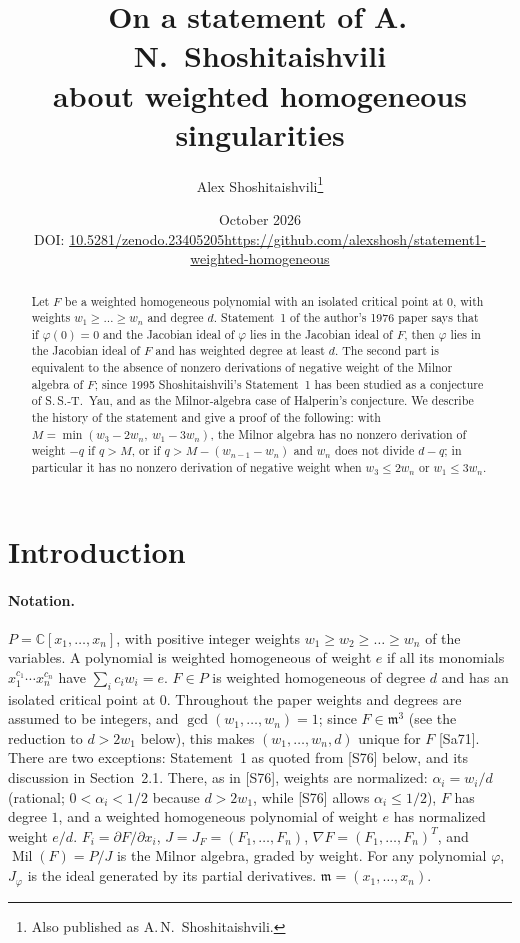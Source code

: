 \documentclass[11pt]{article}
\title{On a statement of A.\,N.~Shoshitaishvili\\ about weighted homogeneous singularities}
\author{Alex Shoshitaishvili\thanks{Also published as A.\,N.~Shoshitaishvili.}}
\date{October 2026\\[4pt]{\small DOI: \href{https://doi.org/10.5281/zenodo.23405205}{10.5281/zenodo.23405205}\quad \url{https://github.com/alexshosh/statement1-weighted-homogeneous}}}
\newcommand{\C}{\mathbb{C}}
\newcommand{\Mil}{\operatorname{Mil}(F)}
\theoremstyle{remark}
\begin{document}
\maketitle

\begin{abstract}
Let $F$ be a weighted homogeneous polynomial with an isolated critical point at $0$, with weights $w_1\ge\dots\ge w_n$ and degree $d$. Statement~1 of the author's 1976 paper says that if $\varphi(0)=0$ and the Jacobian ideal of $\varphi$ lies in the Jacobian ideal of $F$, then $\varphi$ lies in the Jacobian ideal of $F$ and has weighted degree at least $d$. The second part is equivalent to the absence of nonzero derivations of negative weight of the Milnor algebra of $F$; since 1995 Shoshitaishvili's Statement~1 has been studied as a conjecture of S.\,S.-T.~Yau, and as the Milnor-algebra case of Halperin's conjecture. We describe the history of the statement and give a proof of the following: with $M=\min(w_3-2w_n,\ w_1-3w_n)$, the Milnor algebra has no nonzero derivation of weight $-q$ if $q>M$, or if $q>M-(w_{n-1}-w_n)$ and $w_n$ does not divide $d-q$; in particular it has no nonzero derivation of negative weight when $w_3\le2w_n$ or $w_1\le3w_n$.
\end{abstract}

\section{Introduction}

\paragraph{Notation.} $P=\C[x_1,\dots,x_n]$, with positive integer weights $w_1\ge w_2\ge\dots\ge w_n$ of the variables. A polynomial is weighted homogeneous of weight $e$ if all its monomials $x_1^{c_1}\cdots x_n^{c_n}$ have $\sum_ic_iw_i=e$. $F\in P$ is weighted homogeneous of degree $d$ and has an isolated critical point at $0$. Throughout the paper weights and degrees are assumed to be integers, and $\gcd(w_1,\dots,w_n)=1$; since $F\in\mathfrak m^3$ (see the reduction to $d>2w_1$ below), this makes $(w_1,\dots,w_n,d)$ unique for $F$ [Sa71]. There are two exceptions: Statement~1 as quoted from [S76] below, and its discussion in Section~2.1. There, as in [S76], weights are normalized: $\alpha_i=w_i/d$ (rational; $0<\alpha_i<1/2$ because $d>2w_1$, while [S76] allows $\alpha_i\le1/2$), $F$ has degree $1$, and a weighted homogeneous polynomial of weight $e$ has normalized weight $e/d$. $F_i=\partial F/\partial x_i$, $J=J_F=(F_1,\dots,F_n)$, $\nabla F=(F_1,\dots,F_n)^T$, and $\Mil=P/J$ is the Milnor algebra, graded by weight. For any polynomial $\varphi$, $J_\varphi$ is the ideal generated by its partial derivatives. $\mathfrak m=(x_1,\dots,x_n)$.
\end{document}
